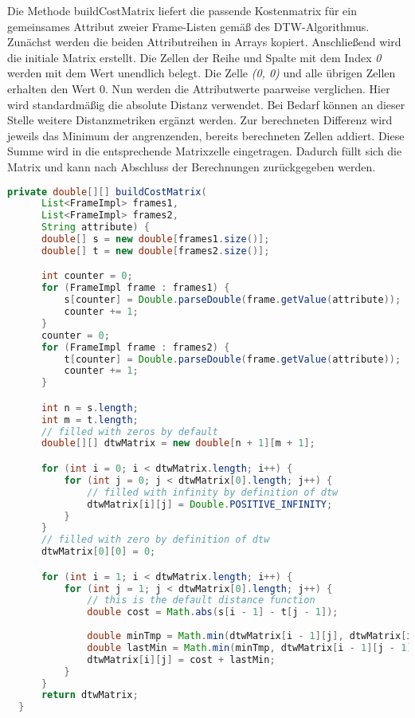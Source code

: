 Die Methode buildCostMatrix liefert die passende Kostenmatrix für ein gemeinsames Attribut
zweier Frame-Listen gemäß des \ac{DTW}-Algorithmus.
Zunächst werden die beiden Attributreihen in Arrays kopiert.
Anschließend wird die initiale Matrix erstellt.
Die Zellen der Reihe und Spalte mit dem Index \emph{0} werden mit dem Wert {\glqq unendlich\grqq} belegt.
Die Zelle \emph{(0, 0)} und alle übrigen Zellen erhalten den Wert 0.
Nun werden die Attributwerte paarweise verglichen.
Hier wird standardmäßig die absolute Distanz verwendet.
Bei Bedarf können an dieser Stelle weitere Distanzmetriken ergänzt werden.
Zur berechneten Differenz wird jeweils das Minimum der angrenzenden, bereits berechneten Zellen addiert.
Diese Summe wird in die entsprechende Matrixzelle eingetragen.
Dadurch füllt sich die Matrix und kann nach Abschluss der Berechnungen zurückgegeben werden.
\begin{lstlisting}[language=Java, caption=DTW: Kostenmatrix.]
  private double[][] buildCostMatrix(
      List<FrameImpl> frames1,
      List<FrameImpl> frames2,
      String attribute) {
      double[] s = new double[frames1.size()];
      double[] t = new double[frames2.size()];

      int counter = 0;
      for (FrameImpl frame : frames1) {
          s[counter] = Double.parseDouble(frame.getValue(attribute));
          counter += 1;
      }
      counter = 0;
      for (FrameImpl frame : frames2) {
          t[counter] = Double.parseDouble(frame.getValue(attribute));
          counter += 1;
      }

      int n = s.length;
      int m = t.length;
      // filled with zeros by default
      double[][] dtwMatrix = new double[n + 1][m + 1];

      for (int i = 0; i < dtwMatrix.length; i++) {
          for (int j = 0; j < dtwMatrix[0].length; j++) {
              // filled with infinity by definition of dtw
              dtwMatrix[i][j] = Double.POSITIVE_INFINITY;
          }
      }
      // filled with zero by definition of dtw
      dtwMatrix[0][0] = 0;

      for (int i = 1; i < dtwMatrix.length; i++) {
          for (int j = 1; j < dtwMatrix[0].length; j++) {
              // this is the default distance function
              double cost = Math.abs(s[i - 1] - t[j - 1]);
              
              double minTmp = Math.min(dtwMatrix[i - 1][j], dtwMatrix[i][j - 1]);
              double lastMin = Math.min(minTmp, dtwMatrix[i - 1][j - 1]);
              dtwMatrix[i][j] = cost + lastMin;
          }
      }
      return dtwMatrix;
  }
\end{lstlisting}
